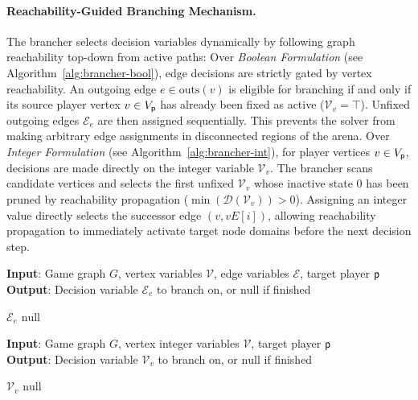 \documentclass{article}
\begin{document}
\begin{appendices}
\paragraph{Reachability-Guided Branching Mechanism.}
The brancher selects decision variables dynamically by following graph reachability top-down from active paths: 
%
Over \textit{Boolean Formulation} (see Algorithm~\ref{alg:brancher-bool}), edge decisions are strictly gated by vertex reachability. An outgoing edge $e \in \text{outs}(v)$ is eligible for branching if and only if its source player vertex $v \in V_{\mathsf{p}}$ has already been fixed as active ($\mathcal{V}_v = \top$). Unfixed outgoing edges $\mathcal{E}_e$ are then assigned sequentially. This prevents the solver from making arbitrary edge assignments in disconnected regions of the arena.
%
Over \textit{Integer Formulation} (see Algorithm~\ref{alg:brancher-int}), for player vertices $v \in V_{\mathsf{p}}$, decisions are made directly on the integer variable $\mathcal{V}_v$. The brancher scans candidate vertices and selects the first unfixed $\mathcal{V}_v$ whose inactive state $0$ has been pruned by reachability propagation ($\min(\mathcal{D}(\mathcal{V}_v)) > 0$). Assigning an integer value directly selects the successor edge $(v, vE[i])$, allowing reachability propagation to immediately activate target node domains before the next decision step.

\begin{algorithm}[htb]
\small
\caption{\textbf{\textit{NOCBrancherBool}}}
\textbf{Input}: Game graph $G$, vertex variables $\mathcal{V}$, edge variables $\mathcal{E}$, target player $\mathsf{p}$ \\
\textbf{Output}: Decision variable $\mathcal{E}_e$ to branch on, or $\text{null}$ if finished
\begin{algorithmic}[1]
                    \RETURN $\mathcal{E}_e$
                \ENDIF
            \ENDFOR
        \ENDIF
    \ENDFOR
    \RETURN $\text{null}$
\end{algorithmic}
\label{alg:brancher-bool}
\end{algorithm}

\begin{algorithm}[htb]
\small
\caption{\textbf{\textit{NOCBrancherInt}}}
\textbf{Input}: Game graph $G$, vertex integer variables $\mathcal{V}$, target player $\mathsf{p}$ \\
\textbf{Output}: Decision variable $\mathcal{V}_v$ to branch on, or $\text{null}$ if finished
\begin{algorithmic}[1]
                \RETURN $\mathcal{V}_v$
            \ENDIF
        \ENDIF
    \ENDFOR
    \RETURN $\text{null}$
\end{algorithmic}
\label{alg:brancher-int}
\end{algorithm}


\end{appendices}
\end{document}
